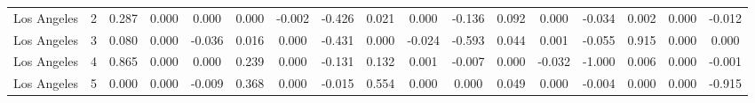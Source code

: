 \begin{tabular}[t]{ccccccccccccccccc}
Los Angeles & 2 & 0.287 & 0.000 & 0.000 & 0.000 & -0.002 & -0.426 & 0.021 & 0.000 & -0.136 & 0.092 & 0.000 & -0.034 & 0.002 & 0.000 & -0.012\\
Los Angeles & 3 & 0.080 & 0.000 & -0.036 & 0.016 & 0.000 & -0.431 & 0.000 & -0.024 & -0.593 & 0.044 & 0.001 & -0.055 & 0.915 & 0.000 & 0.000\\
Los Angeles & 4 & 0.865 & 0.000 & 0.000 & 0.239 & 0.000 & -0.131 & 0.132 & 0.001 & -0.007 & 0.000 & -0.032 & -1.000 & 0.006 & 0.000 & -0.001\\
Los Angeles & 5 & 0.000 & 0.000 & -0.009 & 0.368 & 0.000 & -0.015 & 0.554 & 0.000 & 0.000 & 0.049 & 0.000 & -0.004 & 0.000 & 0.000 & -0.915\\
\bottomrule
\end{tabular}